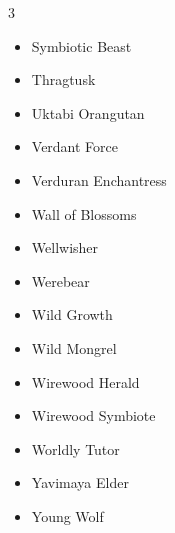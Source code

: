 \documentclass[11pt]{article}
\begin{document}
\begin{multicols}{3}
\begin{itemize}[leftmargin=1em,itemsep=0pt,parsep=0pt]
\item Symbiotic Beast
\item Thragtusk
\item Uktabi Orangutan
\item Verdant Force
\item Verduran Enchantress
\item Wall of Blossoms
\item Wellwisher
\item Werebear
\item Wild Growth
\item Wild Mongrel
\item Wirewood Herald
\item Wirewood Symbiote
\item Worldly Tutor
\item Yavimaya Elder
\item Young Wolf
\end{itemize}
\end{multicols}
\end{document}
